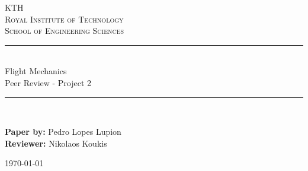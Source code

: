 \newcommand{\horrule}[1]{\rule{\linewidth}{#1}} %

\begin{titlepage}

\begin{center}
\normalfont \normalsize 
\textsc{KTH}\\
\textsc{Royal Institute of Technology} \\  %
\textsc{School of Engineering Sciences} \\ [25pt] %
\horrule{0.5pt} \\[0.4cm] %
\huge Flight Mechanics \vspace{5mm}\\ Peer Review - Project 2 \\ %
\horrule{2pt} \\[0.5cm] %
\vspace*{10mm}
\end{center}

\normalfont \normalsize
\begin{flushleft}
\textbf{Paper by:} Pedro Lopes Lupion\\
\textbf{Reviewer:} Nikolaos Koukis\\
\end{flushleft}

\vfill
\begin{center}
    \today
\end{center}
\end{titlepage}
